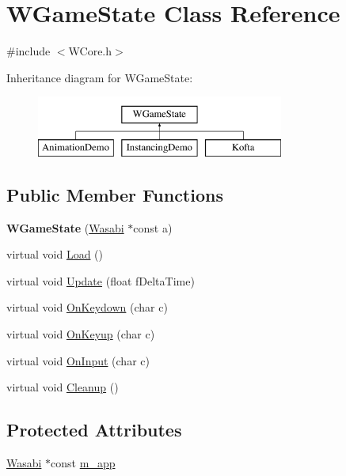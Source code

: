 \hypertarget{class_w_game_state}{}\section{W\+Game\+State Class Reference}
\label{class_w_game_state}


{\ttfamily \#include $<$W\+Core.\+h$>$}

Inheritance diagram for W\+Game\+State\+:\begin{figure}[H]
\begin{center}
\leavevmode
\includegraphics[height=2.000000cm]{class_w_game_state}
\end{center}
\end{figure}
\subsection*{Public Member Functions}
\begin{DoxyCompactItemize}
\item 
{\bfseries W\+Game\+State} (\hyperlink{class_wasabi}{Wasabi} $\ast$const a)\hypertarget{class_w_game_state_a2aa62cdf3a1dc59558b4aa017abdb248}{}\label{class_w_game_state_a2aa62cdf3a1dc59558b4aa017abdb248}

\item 
virtual void \hyperlink{class_w_game_state_a20031e5724a12eb99aa81c013d1d9d63}{Load} ()
\item 
virtual void \hyperlink{class_w_game_state_a5fe5a485ca56800cfd79237be2568d36}{Update} (float f\+Delta\+Time)
\item 
virtual void \hyperlink{class_w_game_state_ac4d0979d5ae27a8fd5df34949ae51d23}{On\+Keydown} (char c)
\item 
virtual void \hyperlink{class_w_game_state_abcae0b58bf3c27406f0783c628a3c714}{On\+Keyup} (char c)
\item 
virtual void \hyperlink{class_w_game_state_a952d55f104f8503f717ecbdcd6a8711c}{On\+Input} (char c)
\item 
virtual void \hyperlink{class_w_game_state_a50eddb2f648dc478ed0e10fee73fd4e9}{Cleanup} ()
\end{DoxyCompactItemize}
\subsection*{Protected Attributes}
\begin{DoxyCompactItemize}
\item 
\hyperlink{class_wasabi}{Wasabi} $\ast$const \hyperlink{class_w_game_state_a68c0b595d15be38854585e6cbcbe452b}{m\+\_\+app}
\end{DoxyCompactItemize}


